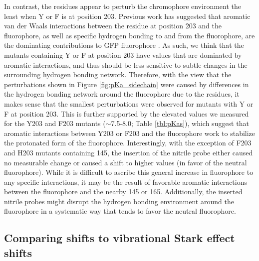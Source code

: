 In contrast, the \pCNF{} residues appear to perturb the chromophore environment the least when Y or F is at position 203.
Previous work has suggested that aromatic van der Waals interactions between the residue at position 203 and the fluorophore, as well as specific hydrogen bonding to and from the fluorophore, are the dominating contributions to GFP fluorophore \pKa{} \cite{Elsliger1999}.
As such, we think that the mutants containing Y or F at position 203 have \pKa{} values that are dominated by aromatic interactions, and thus should be less sensitive to subtle changes in the surrounding hydrogen bonding network.
Therefore, with the view that the perturbations shown in Figure \ref{fig:pKa_sidechain} were caused by differences in the hydrogen bonding network around the fluorophore due to the \pCNF{} residues, it makes sense that the smallest perturbations were observed for mutants with Y or F at position 203.
This is further supported by the elevated \pKa{} values we measured for the Y203 and F203 mutants ($\sim$7.5-8.0; Table \ref{tbl:pKas}), which suggest that aromatic interactions between Y203 or F203 and the fluorophore work to stabilize the protonated form of the fluorophore.
Interestingly, with the exception of F203 and H203 mutants containing \pCNF{} 145, the insertion of the nitrile probe either caused no measurable \pKa{} change or caused a shift to higher \pKa{} values (in favor of the neutral fluorophore).
While it is difficult to ascribe this general increase in fluorophore \pKa{} to any specific interactions, it may be the result of favorable aromatic interactions between the fluorophore and the nearby \pCNF{} 145 or 165.
Additionally, the inserted nitrile probes might disrupt the hydrogen bonding environment around the fluorophore in a systematic way that tends to favor the neutral fluorophore. 

\subsection{Comparing \pKa{} shifts to vibrational Stark effect shifts}

